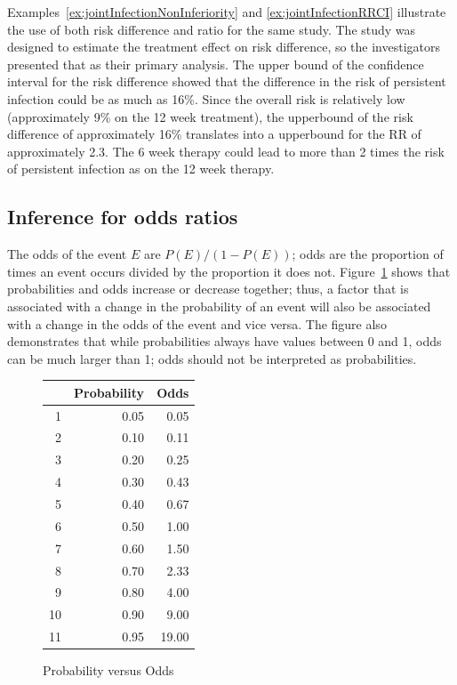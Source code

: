 Examples~\ref{ex:jointInfectionNonInferiority} and \ref{ex:jointInfectionRRCI} illustrate the use of both risk difference and ratio for the same study.   The study was designed to estimate the treatment effect on risk difference, so the investigators presented that as their primary analysis.  The upper bound of the confidence interval for the risk difference showed that the difference in the risk of persistent infection could be as much as 16\%.  Since the overall risk is relatively low (approximately 9\% on the 12 week treatment), the upperbound of the risk difference of approximately 16\% translates into a upperbound for the RR of approximately 2.3.  The 6 week therapy could lead to more than 2 times the risk of persistent infection as on the 12 week therapy.


\subsection{Inference for odds ratios}
\label{inferenceOddsRatios}

The odds of the event $E$ are $P(E)/(1 - P(E))$; odds are the proportion of times an event occurs divided by the proportion it does not.  Figure~\ref{figure:probVsOdds} shows that probabilities and odds increase or decrease together; thus, a factor that is associated with a change in the probability of an event will also be associated with a change in the odds of the event and vice versa.  The figure also demonstrates that while probabilities always have values between 0 and 1, odds can be much larger than 1; odds should not be interpreted as probabilities.


\begin{figure}[ht]
\centering
\begin{tabular}{rrr}
  \hline
 & Probability & Odds \\
  \hline
1 & 0.05 & 0.05 \\
  2 & 0.10 & 0.11 \\
  3 & 0.20 & 0.25 \\
  4 & 0.30 & 0.43 \\
  5 & 0.40 & 0.67 \\
  6 & 0.50 & 1.00 \\
  7 & 0.60 & 1.50 \\
  8 & 0.70 & 2.33 \\
  9 & 0.80 & 4.00 \\
  10 & 0.90 & 9.00 \\
  11 & 0.95 & 19.00 \\
   \hline
\end{tabular}
\caption{Probability versus Odds}
\label{figure:probVsOdds}
\end{figure}

